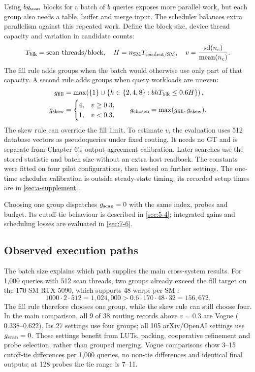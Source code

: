 Using $bg_{\mathrm{scan}}$ blocks for a batch of $b$ queries exposes more parallel
work, but each group also needs a table, buffer and merge input. The
scheduler balances extra parallelism against this repeated work. Define
the block size, device thread capacity and variation in candidate counts:
\[
 T_{\rm blk}=\text{scan threads/block},\quad
 H=n_{\rm SM}T_{\rm resident/SM},\quad
 v=\frac{\operatorname{sd}(n_c)}{\operatorname{mean}(n_c)}.
\]
The fill rule adds groups when the batch would otherwise use only part
of that capacity. A second rule adds groups when query workloads are
uneven:
\begin{align}
 g_{\rm fill}
 &=\max\!\left(\{1\}\cup
       \{h\in\{2,4,8\}:bhT_{\rm blk}\leq0.6H\}\right),
       \label{eq:5-fill-rule}\\
 g_{\rm skew}&=
   \begin{cases}4,&v\geq0.3,\\1,&v<0.3,\end{cases}
 \qquad
 g_{\rm chosen}=\max(g_{\rm fill},g_{\rm skew}).
 \label{eq:5-skew-rule}
\end{align}
The skew rule can override the fill limit. To estimate $v$, the evaluation
uses 512 database vectors as pseudoqueries under fixed routing. It needs
no GT and is separate from Chapter 6's output-agreement calibration.
Later searches use the stored statistic and batch size without an extra
host readback. The constants were fitted on four pilot configurations,
then tested on further settings. The one-time scheduler calibration is
outside steady-state timing; its recorded setup times are in
\cref{sec:a-supplement}.

Choosing one group dispatches $g_{\mathrm{scan}}=0$ with the same index, probes and
budget. Its cutoff-tie behaviour is described in \cref{sec:5-4}; integrated
gains and scheduling losses are evaluated in \cref{sec:7-6}.

\subsection{Observed execution paths}

The batch size explains which path supplies the main cross-system results.
For 1,000 queries with 512 scan threads, two groups already exceed the
fill target on the 170-SM RTX 5090, which supports 48 warps per SM
\cite{blackwell_tuning}:
\[
 1000\cdot2\cdot512=1{,}024{,}000
 >0.6\cdot170\cdot48\cdot32=156{,}672.
\]
The fill rule therefore chooses one group, while the skew rule can still
choose four. In the main comparison, all 9 of 38 routing records above $v=0.3$ are Vogue
($0.338$--$0.622$). Its 27 settings use four groups; all 105 arXiv/OpenAI
settings use $g_{\mathrm{scan}}=0$. Those settings benefit from LUTs, packing,
cooperative refinement and probe selection, rather than grouped merging.
Vogue comparisons show 3--15 cutoff-tie differences per 1,000 queries,
no non-tie differences and identical final outputs; at 128 probes the
tie range is 7--11.

